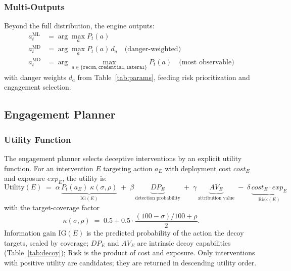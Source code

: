 \documentclass[11pt]{article}
\newcommand{\act}[1]{\texttt{#1}}
\begin{document}
\subsubsection{Multi-Outputs}

Beyond the full distribution, the engine outputs:
\begin{align}
a^{\mathrm{ML}}_t &= \arg\max_a P_t(a) \label{eq:most-likely} \\
a^{\mathrm{MD}}_t &= \arg\max_a P_t(a)\, d_a \quad\text{(danger-weighted)}
\label{eq:most-dangerous} \\
a^{\mathrm{MO}}_t &= \arg\max_{a \in \{\act{recon},\act{credential},
\act{lateral}\}} P_t(a) \quad\text{(most observable)}
\label{eq:most-observable}
\end{align}
with danger weights $d_a$ from Table~\ref{tab:params}, feeding risk
prioritization and engagement selection.

\subsection{Engagement Planner}
\label{sec:engagement}

\subsubsection{Utility Function}
\label{sec:utility-formal}

The engagement planner selects deceptive interventions by an explicit
utility function. For an intervention $E$ targeting action $a_E$ with
deployment cost $\mathit{cost}_E$ and exposure $\mathit{exp}_E$, the utility
is:
\begin{equation}
\label{eq:utility}
\mathrm{Utility}(E) \;=\;
\alpha\,\underbrace{P_t(a_E)\; \kappa(\sigma,\rho)}_{\mathrm{IG}(E)}
\;+\; \beta\,\underbrace{\mathit{DP}_E}_{\text{detection probability}}
\;+\; \gamma\,\underbrace{\mathit{AV}_E}_{\text{attribution value}}
\;-\; \delta\,\underbrace{\mathit{cost}_E \cdot \mathit{exp}_E}_{\mathrm{Risk}(E)}
\end{equation}
with the target-coverage factor
\begin{equation}
\label{eq:coverage}
\kappa(\sigma,\rho) \;=\; 0.5 + 0.5 \cdot \frac{(100-\sigma)/100 + \rho}{2}.
\end{equation}
Information gain $\mathrm{IG}(E)$ is the predicted probability of the action
the decoy targets, scaled by coverage; $\mathit{DP}_E$ and $\mathit{AV}_E$
are intrinsic decoy capabilities (Table~\ref{tab:decoy}); Risk is the
product of cost and exposure. Only interventions with positive utility are
candidates; they are returned in descending utility order.
\end{document}
